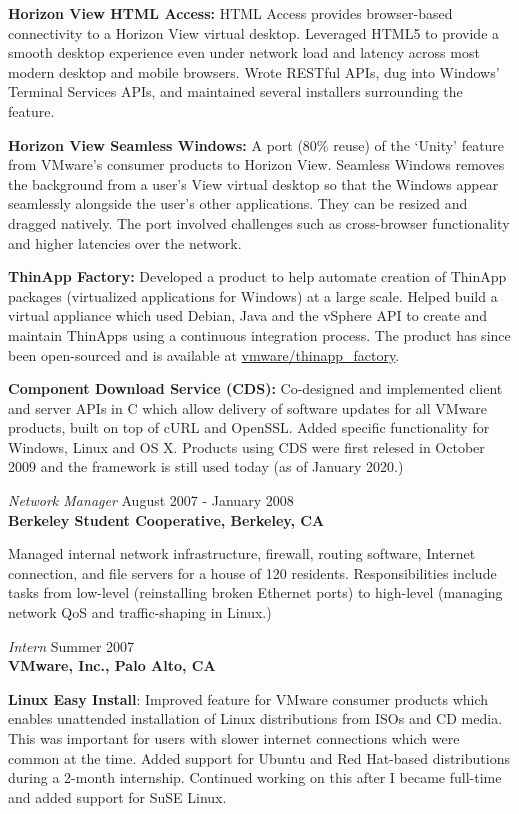 \documentclass[overlapped,line,margin]{res}
\begin{document}
\begin{resume}
  \textbf{Horizon View HTML Access:} HTML Access provides browser-based
  connectivity to a Horizon View virtual desktop. Leveraged HTML5 to
  provide a smooth desktop experience even under network load and
  latency across most modern desktop and mobile browsers. Wrote RESTful
  APIs, dug into Windows' Terminal Services APIs, and maintained several
  installers surrounding the feature.

  \textbf{Horizon View Seamless Windows:} A port (80\% reuse) of the
  `Unity' feature from VMware's consumer products to Horizon View.
  Seamless Windows removes the background from a user's View virtual
  desktop so that the Windows appear seamlessly alongside the user's
  other applications. They can be resized and dragged natively. The
  port involved challenges such as cross-browser functionality and
  higher latencies over the network.

  \textbf{ThinApp Factory:} Developed a product to help automate
  creation of ThinApp packages (virtualized applications for Windows) at
  a large scale. Helped build a virtual appliance which used Debian,
  Java and the vSphere API to create and maintain ThinApps using a
  continuous integration process. The product has since been
  open-sourced and is available at
  \href{https://github.com/vmware/thinapp\_factory}{vmware/thinapp\_factory}.

  \textbf{Component Download Service (CDS):} Co-designed and implemented
  client and server APIs in C which allow delivery of software updates for
  all VMware products, built on top of cURL and OpenSSL. Added specific
  functionality for Windows, Linux and OS X. Products using CDS were
  first relesed in October 2009 and the framework is still used today
  (as of January 2020.)

\textit{Network Manager} \hfill August 2007 - January 2008 \\
\textbf{Berkeley Student Cooperative, Berkeley, CA}

  Managed internal network infrastructure, firewall, routing
  software, Internet connection, and file servers for a house of 120 residents.
  Responsibilities include tasks from low-level (reinstalling broken Ethernet
  ports) to high-level (managing network QoS and traffic-shaping in Linux.)

\textit{Intern} \hfill Summer 2007 \\
\textbf{VMware, Inc., Palo Alto, CA}

  \textbf{Linux Easy Install}: Improved feature for VMware consumer
  products which enables unattended installation of Linux distributions
  from ISOs and CD media. This was important for users with slower
  internet connections which were common at the time. Added support for
  Ubuntu and Red Hat-based distributions during a 2-month internship.
  Continued working on this after I became full-time and added support
  for SuSE Linux.


\end{resume}
\end{document}
